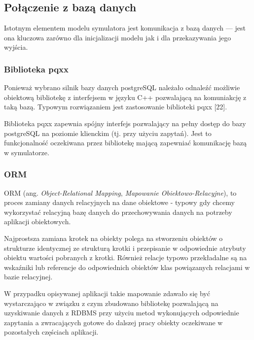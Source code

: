 {{\subsection{Połączenie z bazą danych}
\par{
Istotnym elementem modelu symulatora jest komunikacja z bazą danych --- jest ona kluczowa zarówno dla inicjalizacji modelu jak i dla przekazywania jego wyjścia.
}
\subsubsection{Biblioteka pqxx}
\par{
Ponieważ wybrano silnik bazy danych postgreSQL należało odnaleźć możliwie obiektową bibliotekę z interfejsem w języku C++ pozwalającą na komuniakcję z taką bazą. Typowym rozwiązaniem jest zastosowanie biblioteki pqxx [22].
}
\par{
Biblioteka pqxx zapewnia spójny interfejs pozwalający na pełny dostęp do bazy postgreSQL na poziomie klienckim (tj. przy użyciu zapytań). Jest to funkcjonalność oczekiwana przez bibliotekę mającą zapewniać komunikację bazą w symulatorze.
}
\subsubsection{ORM}
\par{
ORM (ang. \textit{Object-Relational Mapping}, \textit{Mapowanie Obiektowo-Relacyjne}), to proces zamiany danych relacyjnych na dane obiektowe - typowy gdy chcemy wykorzystać relacyjną bazę danych do przechowywania danych na potrzeby aplikacji obiektowych.
}
\par{
Najprostsza zamiana krotek na obiekty polega na stworzeniu obiektów o strukturze identycznej ze strukturą krotki i przepisanie w odpowiednie atrybuty obiektu wartości pobranych z krotki. Również relacje typowo przekładalne są na wskaźniki lub referencje do odpowiednich obiektów klas powiązanych relacjami w bazie relacyjnej.
}
\par{
W przypadku opisywanej aplikacji takie mapowanie zdawało się być wystarczająco w związku z czym zbudowano bibliotekę pozwalającą na uzyskiwanie danych z RDBMS przy użyciu metod wykonujących odpowiednie zapytania a zwracających gotowe do dalszej pracy obiekty oczekiwane w pozostałych częściach aplikacji.
}

}}
